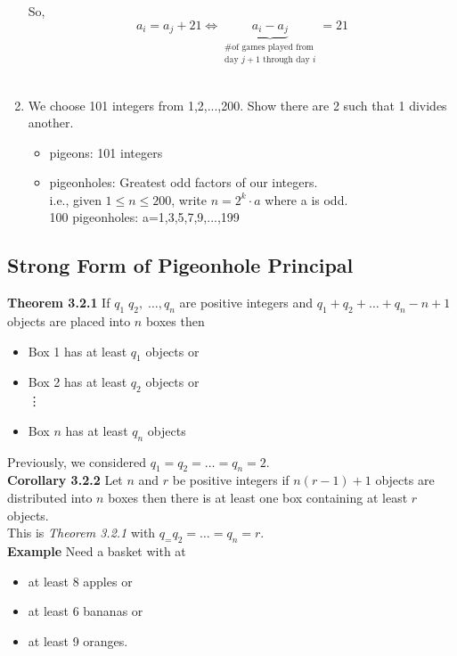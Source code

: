 \documentclass[12pt]{article}
\begin{document}
\begin{enumerate}
    So,$$a_i=a_j+21\Leftrightarrow \underbrace{a_i-a_j}_{\substack{\text{\# of games played from}\\ \text{day $j+1$ through day $i$}}}=21$$\\
    
    
    \item We choose 101 integers from 1,2,...,200. Show there are 2 such that 1 divides another.
    \begin{itemize}
        \item pigeons: 101 integers
        \item pigeonholes: Greatest odd factors of our integers.\\
        
        i.e., given $1\le n\le 200$, write $n=2^k\cdot a$ where a is odd.\\
        
        100 pigeonholes: a=1,3,5,7,9,...,199
        
        
    \end{itemize}
\end{enumerate}


\newpage
\subsection{Strong Form of Pigeonhole Principal}
{\bf Theorem 3.2.1} If $q_1\;q_2,\;\ldots,q_n$ are positive integers and $q_1+q_2+\ldots+q_n-n+1$ objects are placed into $n$ boxes then 
\begin{itemize}
    \item Box 1 has at least $q_1$ objects or
    \item Box 2 has at least $q_2$ objects or\\
    \vdots
    \item Box $n$ has at least $q_n$ objects
\end{itemize}

Previously, we considered $q_1=q_2=\ldots=q_n=2.$\\

{\bf Corollary 3.2.2} Let $n$ and $r$ be positive integers if $n(r-1)+1$ objects are distributed into $n$ boxes then there is at least one box containing at least $r$ objects.\\

This is {\sl Theorem 3.2.1} with $q_=q_2=\ldots =q_n=r$.\\

{\bf Example} Need a basket with at
\begin{itemize}
    \item at least 8 apples or 
    \item at least 6 bananas or 
    \item at least 9 oranges.
\end{itemize}
\end{document}
